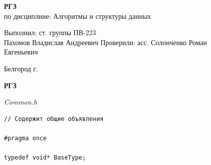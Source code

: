 \documentclass[a4paper,14pt]{extarticle}
\newcommand\textbox[1]{
	\parbox{.45\textwidth}{#1}
}
\begin{document}
\vfill
\begin{center}
	\large{
		\textbf{
			РГЗ}}\\
	\normalsize{
		по дисциплине: Алгоритмы и структуры данных}
\end{center}
\vfill
\hfill\textbox{
	Выполнил: ст. группы ПВ-223\\Пахомов Владислав Андреевич
	\bigbreak
	Проверили: асс. Солонченко Роман\\Евгеньевич
}
\vfill\begin{center}
	Белгород \the\year г.
\end{center}
\newpage
\begin{center}
	\textbf{РГЗ}
\end{center}
\textit{Common.h}
\begin{verbatim}
// Содержит общие объявления

#pragma once

typedef void* BaseType;
\end{verbatim}
\end{document}

